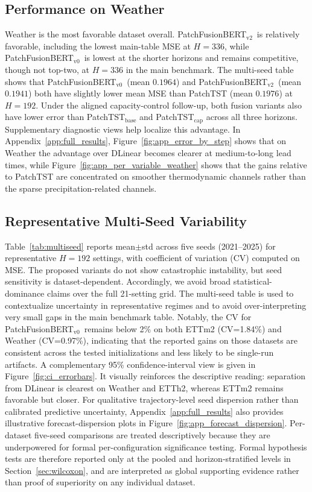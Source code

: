 \documentclass{ieeeaccess}
\newcommand{\modelvzero}{PatchFusionBERT$_{\text{v0}}$\xspace}
\newcommand{\modelvtwo}{PatchFusionBERT$_{\text{v2}}$\xspace}
\begin{document}
\subsection{Performance on Weather}
Weather is the most favorable dataset overall. \modelvtwo\ is relatively favorable,
including the lowest main-table MSE at $H=336$, while \modelvzero\ is lowest at
the shorter horizons and remains competitive, though not top-two, at $H=336$ in the
main benchmark. The multi-seed table shows that \modelvzero\ (mean $0.1964$) and
\modelvtwo\ (mean $0.1941$) both have slightly lower mean MSE than PatchTST (mean $0.1976$) at
$H=192$. Under the aligned capacity-control follow-up, both fusion variants also
have lower error than PatchTST$_\text{base}$ and PatchTST$_\text{cap}$ across all three
horizons. Supplementary diagnostic views help localize this advantage. In
Appendix~\ref{app:full_results}, Figure~\ref{fig:app_error_by_step} shows that on
Weather the advantage over DLinear becomes clearer at medium-to-long lead times,
while Figure~\ref{fig:app_per_variable_weather} shows that the gains relative to
PatchTST are concentrated on smoother thermodynamic channels rather than the sparse
precipitation-related channels.

\subsection{Representative Multi-Seed Variability}
Table~\ref{tab:multiseed} reports mean$\pm$std across five seeds (2021--2025) for representative
$H=192$ settings, with coefficient of variation (CV)
computed on MSE. The proposed variants do not show catastrophic
instability, but seed sensitivity is dataset-dependent.
Accordingly, we avoid broad statistical-dominance claims over the full
21-setting grid. The multi-seed table is used to contextualize uncertainty
in representative regimes and to avoid over-interpreting very small gaps
in the main benchmark table. Notably, the CV for \modelvzero\ remains
below 2\% on both ETTm2 (CV=1.84\%) and Weather (CV=0.97\%), indicating
that the reported gains on those datasets are consistent across the tested
initializations and less likely to be single-run artifacts. A complementary 95\%
confidence-interval view is given in Figure~\ref{fig:ci_errorbars}. It visually
reinforces the descriptive reading: separation from DLinear is clearest on Weather
and ETTh2, whereas ETTm2 remains favorable but closer. For qualitative
trajectory-level seed dispersion rather than calibrated predictive uncertainty,
Appendix~\ref{app:full_results} also provides illustrative forecast-dispersion
plots in Figure~\ref{fig:app_forecast_dispersion}.
Per-dataset five-seed comparisons are treated descriptively because they are
underpowered for formal per-configuration significance testing. Formal hypothesis
tests are therefore reported only at the pooled and horizon-stratified levels in
Section~\ref{sec:wilcoxon}, and are interpreted as global supporting evidence
rather than proof of superiority on any individual dataset.
\end{document}
